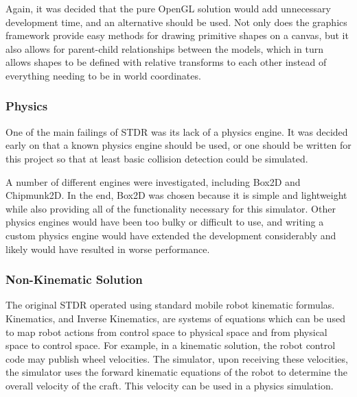  	Again, it was decided that the pure OpenGL solution would add unnecessary development time, and an alternative should be used. Not only does the graphics framework provide easy methods for drawing primitive shapes on a canvas, but it also allows for parent-child relationships between the models, which in turn allows shapes to be defined with relative transforms to each other instead of everything needing to be in world coordinates.
 	
 	\subsubsection*{Physics}
 	One of the main failings of STDR was its lack of a physics engine. It was decided early on that a known physics engine should be used, or one should be written for this project so that at least basic collision detection could be simulated.
 	
 	A number of different engines were investigated, including Box2D and Chipmunk2D. In the end, Box2D was chosen because it is simple and lightweight while also providing all of the functionality necessary for this simulator. Other physics engines would have been too bulky or difficult to use, and writing a custom physics engine would have extended the development considerably and likely would have resulted in worse performance.

	\subsubsection*{Non-Kinematic Solution}
	The original STDR operated using standard mobile robot kinematic formulas. Kinematics, and Inverse Kinematics, are systems of equations which can be used to map robot actions from control space to physical space and from physical space to control space. For example, in a kinematic solution, the robot control code may publish wheel velocities. The simulator, upon receiving these velocities, the simulator uses the forward kinematic equations of the robot to determine the overall velocity of the craft. This velocity can be used in a physics simulation.
	
